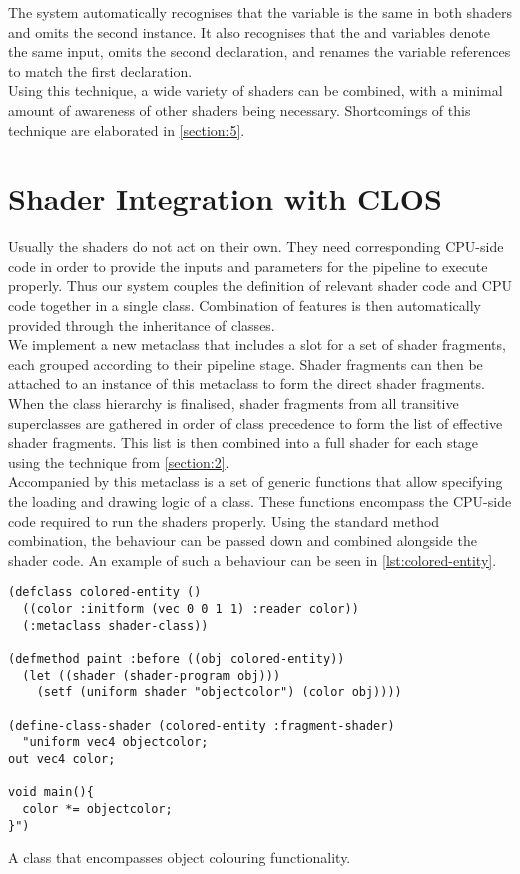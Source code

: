 \documentclass{sig-alternate}
\begin{document}
The system automatically recognises that the  variable is the same in both shaders and omits the second instance. It also recognises that the  and  variables denote the same input, omits the second declaration, and renames the variable references to match the first declaration. \\

Using this technique, a wide variety of shaders can be combined, with a minimal amount of awareness of other shaders being necessary. Shortcomings of this technique are elaborated in \autoref{section:5}.

\section{Shader Integration with CLOS}\label{section:4}
Usually the shaders do not act on their own. They need corresponding CPU-side code in order to provide the inputs and parameters for the pipeline to execute properly. Thus our system couples the definition of relevant shader code and CPU code together in a single class. Combination of features is then automatically provided through the inheritance of classes. \\

We implement a new metaclass that includes a slot for a set of shader fragments, each grouped according to their pipeline stage. Shader fragments can then be attached to an instance of this metaclass to form the direct shader fragments. When the class hierarchy is finalised, shader fragments from all transitive superclasses are gathered in order of class precedence to form the list of effective shader fragments. This list is then combined into a full shader for each stage using the technique from \autoref{section:2}. \\

Accompanied by this metaclass is a set of generic functions that allow specifying the loading and drawing logic of a class. These functions encompass the CPU-side code required to run the shaders properly. Using the standard method combination, the behaviour can be passed down and combined alongside the shader code. An example of such a behaviour can be seen in \autoref{lst:colored-entity}.\\

\begin{listing}[h]
\begin{verbatim}
(defclass colored-entity ()
  ((color :initform (vec 0 0 1 1) :reader color))
  (:metaclass shader-class))

(defmethod paint :before ((obj colored-entity))
  (let ((shader (shader-program obj)))
    (setf (uniform shader "objectcolor") (color obj))))

(define-class-shader (colored-entity :fragment-shader)
  "uniform vec4 objectcolor;
out vec4 color;

void main(){
  color *= objectcolor;
}")
\end{verbatim}
\caption{A  class that encompasses object colouring functionality.}
\label{lst:colored-entity}
\end{listing}
\end{document}
